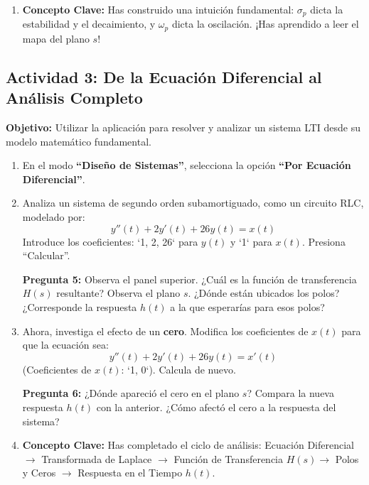 \documentclass[12pt, a4paper]{article}
\begin{document}
\begin{framed}
\begin{enumerate}[label=\textbf{\arabic*.}]
    \textbf{Pregunta 4:} ¿Qué coordenada del polo ($\sigma$ o $\omega$) controla la \textbf{frecuencia de oscilación} de $h(t)$? ¿Qué coordenada controla la \textbf{velocidad de amortiguamiento}?
    
    \vspace{2cm}
    
    \item \textbf{Concepto Clave:} Has construido una intuición fundamental: $\sigma_p$ dicta la estabilidad y el decaimiento, y $\omega_p$ dicta la oscilación. ¡Has aprendido a leer el mapa del plano $s$!
\end{enumerate}
\end{framed}

\vspace{1cm}

\begin{framed}
\subsection*{Actividad 3: De la Ecuación Diferencial al Análisis Completo}
\textbf{Objetivo:} Utilizar la aplicación para resolver y analizar un sistema LTI desde su modelo matemático fundamental.

\begin{enumerate}[label=\textbf{\arabic*.}]
    \item En el modo \textbf{``Diseño de Sistemas''}, selecciona la opción \textbf{``Por Ecuación Diferencial''}.
    \item Analiza un sistema de segundo orden subamortiguado, como un circuito RLC, modelado por:
    \[ y''(t) + 2y'(t) + 26y(t) = x(t) \]
    Introduce los coeficientes: `1, 2, 26` para $y(t)$ y `1` para $x(t)$. Presiona ``Calcular''.
    
    \textbf{Pregunta 5:} Observa el panel superior. ¿Cuál es la función de transferencia $H(s)$ resultante? Observa el plano $s$. ¿Dónde están ubicados los polos? ¿Corresponde la respuesta $h(t)$ a la que esperarías para esos polos?
    
    \vspace{2cm}
    
    \item Ahora, investiga el efecto de un \textbf{cero}. Modifica los coeficientes de $x(t)$ para que la ecuación sea:
     \[ y''(t) + 2y'(t) + 26y(t) = x'(t) \]
     (Coeficientes de $x(t)$: `1, 0`). Calcula de nuevo.
     
     \textbf{Pregunta 6:} ¿Dónde apareció el cero en el plano $s$? Compara la nueva respuesta $h(t)$ con la anterior. ¿Cómo afectó el cero a la respuesta del sistema?
    
    \vspace{2cm}

    \item \textbf{Concepto Clave:} Has completado el ciclo de análisis: Ecuación Diferencial $\rightarrow$ Transformada de Laplace $\rightarrow$ Función de Transferencia $H(s) \rightarrow$ Polos y Ceros $\rightarrow$ Respuesta en el Tiempo $h(t)$.
\end{enumerate}
\end{framed}
\end{document}
